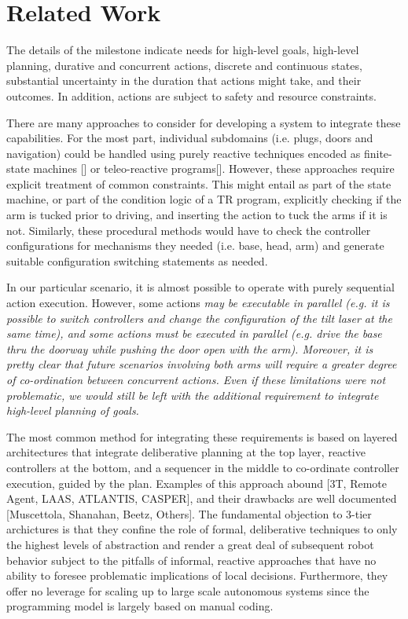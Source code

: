 \documentclass[letterpaper]{article}
\begin{document}
\section{Related Work}
The details of the milestone indicate needs for high-level goals, high-level planning, durative and concurrent actions, discrete and continuous states, substantial uncertainty in the duration that actions might take, and their outcomes. In addition, actions are subject to safety and resource constraints. 

There are many approaches to consider for developing a system to integrate these capabilities.
For the most part, individual subdomains (i.e. plugs, doors and navigation) could be handled using purely reactive techniques encoded as finite-state machines [] or teleo-reactive programs[]. However, these approaches require explicit treatment of common constraints. This might entail as part of the state machine, or part of the condition logic of a TR program, explicitly checking if the arm is tucked prior to driving, and inserting the action to tuck the arms if it is not. Similarly, these procedural methods would have to check the controller configurations for mechanisms they needed (i.e. base, head, arm) and generate suitable configuration switching statements as needed. 

In our particular scenario, it is almost possible to operate with purely sequential action execution. However, some actions \em may be executable in parallel (e.g. it is possible to switch controllers and change the configuration of the tilt laser at the same time), and some actions \em must be executed in parallel (e.g. drive the base thru the doorway while pushing the door open with the arm). Moreover, it is pretty clear that future scenarios involving both arms will require a greater degree of co-ordination between concurrent actions. Even if these limitations were not problematic, we would still be left with the additional requirement to integrate high-level planning of goals. 

The most common method for integrating these requirements is based on layered architectures that integrate deliberative planning at the top layer, reactive controllers at the bottom, and a sequencer in the middle to co-ordinate controller execution, guided by the plan. Examples of this approach abound [3T, Remote Agent, LAAS, ATLANTIS, CASPER], and their drawbacks are well documented [Muscettola, Shanahan, Beetz, Others]. The fundamental objection to 3-tier archictures is that they confine the role of formal, deliberative techniques to only the highest levels of abstraction and render a great deal of subsequent robot behavior subject to the pitfalls of informal, reactive approaches that have no ability to foresee problematic implications of local decisions. Furthermore, they offer no leverage for scaling up to large scale autonomous systems since the programming model is largely based on manual coding. 
\end{document}
